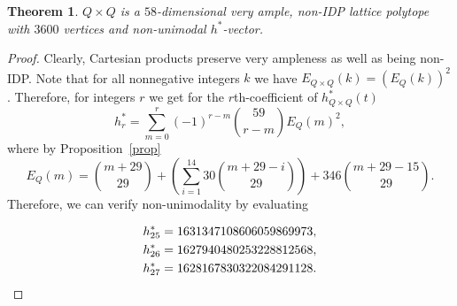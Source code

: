 \documentclass[10pt,a4paper]{amsart}
\newtheorem{thm}{Theorem}
\newcommand{\hs}{h^*}
\begin{document}
\begin{thm} \label{thm:main}
    $Q \times Q$ is a $58$-dimensional very ample, non-IDP lattice polytope with $3600$ vertices and non-unimodal $h^*$-vector.
\end{thm}

\begin{proof}
    Clearly, Cartesian products preserve very ampleness as well as being non-IDP. Note that for all nonnegative integers $k$ we have $E_{Q \times Q}(k)=(E_Q(k))^2$. Therefore, for integers $r$ we get for the $r$th-coefficient of $h^*_{Q \times Q}(t)$
    \[h_r^*=\sum_{m=0}^r (-1)^{r-m} \binom{59}{r-m} E_Q(m)^2,\]
    where by Proposition~\ref{prop}
    \[E_Q(m)=\binom{m+29}{29}+\left(\sum_{i=1}^{14} 30 \binom{m+29-i}{29}\right) + 346 \binom{m+29-15}{29}.\] 
    Therefore, we can verify non-unimodality by evaluating
    
    \begin{align*}
        \hs_{25} &= 1631347108606059869973,\\
        \hs_{26} &= 1627940480253228812568,\\
        \hs_{27} &= 1628167830322084291128. \qedhere
    \end{align*}
\end{proof}
\end{document}
